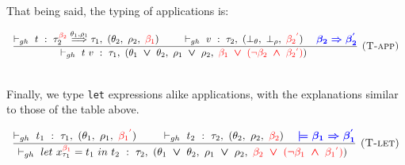 \documentclass[a4paper,11pt,oneside]{article}
\theoremstyle{plain}
\newcommand{\rouge}[1]{\textcolor{red}{#1}}
\newcommand{\bwedge}{\boldsymbol{~\wedge~}}
\newcommand{\bvee}{\boldsymbol{~\vee~}}
\newcommand{\ghosttyping}[6]{\vdash_{gh}~#1~:~#2,~(#3,~#4,~\rouge{#5})~\textcolor{blue}{\boldsymbol{#6}}}
\newcommand{\bth}{\bot_\theta}
\newcommand{\brh}{\bot_\rho}
\newcommand{\gba}[1]{\beta_{#1}}
\newcommand{\gbb}{\bot_\beta}
\newcommand{\gbt}{\top_\beta}
\newcommand{\gbra}[1]{\textcolor{red}{\gba{#1}}}
\newcommand{\gbbr}{\textcolor{red}{\gbb}}
\newcommand{\gbtr}{\textcolor{red}{\gbt}}
\newcommand{\gbran}[1]{\textcolor{red}{\neg\gba{#1}}}
\begin{document}
That being said, the typing of applications is: 
\begin{footnotesize}	
\begin{displaymath}
\begin{array}{l}
\dfrac
	{
		\ghosttyping
			{t}
			{{\tau_{2}^{\gbra{2}} \stackrel{\theta_1, \rho_1}{\Longrightarrow} \tau_1}}
			{\theta_2}
			{\rho_2}
			{\gbra{1}}
			{} \qquad
		\ghosttyping
		{v}
		{\tau_2}
		{\bth}
		{\brh}
		{\gbra{2}^{\rouge{'}}}
		{\quad \gba{2} \Rightarrow \gba{2}^{'}}}
	{
		\ghosttyping
			{t~v}
			{\tau_1}
			{\theta_1 \bvee \theta_2}
			{\rho_1 \bvee \rho_2}
			{\gbra{1} \bvee (\gbran{2} \bwedge \gbra{2}^{\rouge{'}})}
			{}}
	{
		\textsc{  (T-app)}} 
\end{array}	
\end{displaymath}
\end{footnotesize}	
~\\
Finally, we type \texttt{let} expressions alike applications, with the explanations similar to those of the table above.
%
\begin{footnotesize}	
\begin{displaymath}
\begin{array}{l}
\dfrac
	{
		\ghosttyping
			{t_1}
			{\tau_1}
			{\theta_1}
			{\rho_1}
			{\gbra{1}^{\rouge{'}}}
			{} \qquad
		\ghosttyping
			{t_2}
			{\tau_2}
			{\theta_2}
			{\rho_2}
			{\gbra{2}}
			{  \quad \models \gba{1} \Rightarrow \gba{1}^{'}}
	}
	{\ghosttyping
		{let~x^{\gbra{1}}_{\tau_1} = t_1~in~t_2}
		{\tau_2}
		{\theta_1 \bvee \theta_2}
		{\rho_1 \bvee \rho_2}
		{\gbra{2} \bvee (\gbran{1} \bwedge \gbra{1}^{\rouge{'}})}
		{}}
	{\textsc{  (T-let)}}
	\end{array}	
\end{displaymath}
\end{footnotesize}	
~\\
\end{document}
